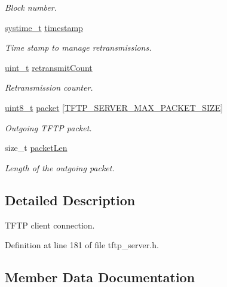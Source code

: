 \begin{DoxyCompactItemize}
\begin{DoxyCompactList}\small\item\em Block number. \end{DoxyCompactList}\item 
\hyperlink{compiler__port_8h_ae3e32a98d431a02106616da3071832dd}{systime\+\_\+t} \hyperlink{struct__TftpClientConnection_ab4a0c626593f974ddd769feeeb4c62c9}{timestamp}
\begin{DoxyCompactList}\small\item\em Time stamp to manage retransmissions. \end{DoxyCompactList}\item 
\hyperlink{compiler__port_8h_a12a1e9b3ce141648783a82445d02b58d}{uint\+\_\+t} \hyperlink{struct__TftpClientConnection_a104af77609ea2b1c071bc19d085a6e60}{retransmit\+Count}
\begin{DoxyCompactList}\small\item\em Retransmission counter. \end{DoxyCompactList}\item 
\hyperlink{stdint_8h_aba7bc1797add20fe3efdf37ced1182c5}{uint8\+\_\+t} \hyperlink{struct__TftpClientConnection_af43957a98e59a481f7988a21e1c5d9d4}{packet} \mbox{[}\hyperlink{tftp__server_8h_a691c548eb2ec25b559ea9029f36a5276}{T\+F\+T\+P\+\_\+\+S\+E\+R\+V\+E\+R\+\_\+\+M\+A\+X\+\_\+\+P\+A\+C\+K\+E\+T\+\_\+\+S\+I\+ZE}\mbox{]}
\begin{DoxyCompactList}\small\item\em Outgoing T\+F\+TP packet. \end{DoxyCompactList}\item 
size\+\_\+t \hyperlink{struct__TftpClientConnection_a906723ec79e3212d7b415c67cd075b5e}{packet\+Len}
\begin{DoxyCompactList}\small\item\em Length of the outgoing packet. \end{DoxyCompactList}\end{DoxyCompactItemize}


\subsection{Detailed Description}
T\+F\+TP client connection. 

Definition at line 181 of file tftp\+\_\+server.\+h.



\subsection{Member Data Documentation}
\mbox{\label{struct__TftpClientConnection_a9adfdabd7901165364f3d194c3239974}} 

